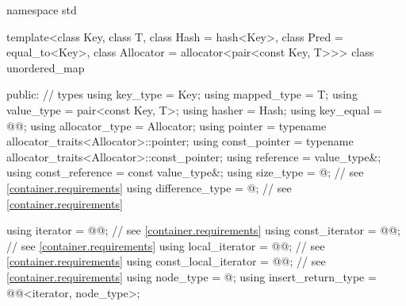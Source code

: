 %
\begin{codeblock}
namespace std {
  template<class Key,
           class T,
           class Hash = hash<Key>,
           class Pred = equal_to<Key>,
           class Allocator = allocator<pair<const Key, T>>>
  class unordered_map {
  public:
    // types
    using key_type             = Key;
    using mapped_type          = T;
    using value_type           = pair<const Key, T>;
    using hasher               = Hash;
    using key_equal            = @@;
    using allocator_type       = Allocator;
    using pointer              = typename allocator_traits<Allocator>::pointer;
    using const_pointer        = typename allocator_traits<Allocator>::const_pointer;
    using reference            = value_type&;
    using const_reference      = const value_type&;
    using size_type            = @\impdef@; // see \ref{container.requirements}
    using difference_type      = @\impdef@; // see \ref{container.requirements}

    using iterator             = @@; // see \ref{container.requirements}
    using const_iterator       = @@; // see \ref{container.requirements}
    using local_iterator       = @@; // see \ref{container.requirements}
    using const_local_iterator = @@; // see \ref{container.requirements}
    using node_type            = @\unspec@;
    using insert_return_type   = @@<iterator, node_type>;

}}
\end{codeblock}
